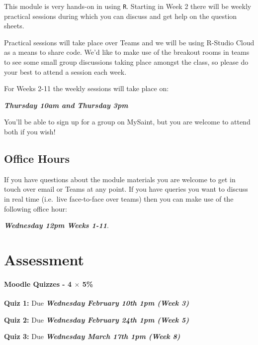 \documentclass[
  openany]{book}
\begin{document}
This module is very hands-on in using \texttt{R}. Starting in Week 2 there will be weekly practical sessions during which you can discuss and get help on the question sheets.

Practical sessions will take place over Teams and we will be using R-Studio Cloud as a means to share code. We'd like to make use of the breakout rooms in teams to see some small group discussions taking place amongst the class, so please do your best to attend a session each week.

For Weeks 2-11 the weekly sessions will take place on:

\textbf{\emph{Thursday 10am and Thursday 3pm}}

You'll be able to sign up for a group on MySaint, but you are welcome to attend both if you wish!

\hypertarget{office-hours}{%
\section*{Office Hours}\label{office-hours}}

If you have questions about the module materials you are welcome to get in touch over email or Teams at any point. If you have queries you want to discuss in real time (i.e.~live face-to-face over teams) then you can make use of the following office hour:

\textbf{\emph{Wednesday 12pm Weeks 1-11}}.

\hypertarget{assessment}{%
\chapter*{Assessment}\label{assessment}}

\hypertarget{moodle-quizzes---4-times-5}{%
\subsubsection*{\texorpdfstring{Moodle Quizzes - 4 \(\times\) 5\%}{Moodle Quizzes - 4 \textbackslash times 5\%}}\label{moodle-quizzes---4-times-5}}

\textbf{Quiz 1:} Due \textbf{\emph{Wednesday February 10th 1pm (Week 3)}}

\textbf{Quiz 2:} Due \textbf{\emph{Wednesday February 24th 1pm (Week 5)}}

\textbf{Quiz 3:} Due \textbf{\emph{Wednesday March 17th 1pm (Week 8)}}
\end{document}
